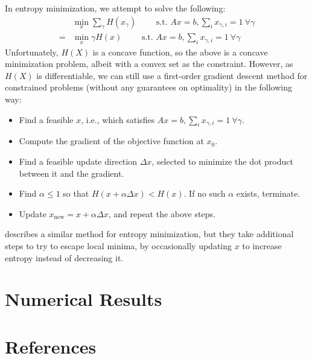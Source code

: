 \documentclass{article} %
\begin{document}
In entropy minimization, we attempt to solve the following:
\begin{align*}
&  \min_{x} \sum_\gamma H(x_\gamma) \qquad \text{ s.t. } Ax = b, \sum_i x_{\gamma, i} = 1\ \forall \gamma \\
=& \min_{x} \gamma H(x) \qquad \text{ s.t. } Ax = b, \sum_i x_{\gamma, i} = 1\ \forall \gamma
\end{align*}
Unfortunately, $H(X)$ is a concave function, so the above is a concave minimization problem, albeit with a convex set as the constraint.
However, as $H(X)$ is differentiable, we can still use a first-order gradient descent method for constrained problems (without any guarantees on optimality) in the following way:
\begin{itemize}
  \item Find a feasible $x$, i.e., which satisfies $Ax = b, \sum_i x_{\gamma, i} = 1\ \forall \gamma$.
  \item Compute the gradient of the objective function at $x_0$.
  \item Find a feasible update direction $\Delta x$, selected to minimize the dot product between it and the gradient.
  \item Find $\alpha \le 1$ so that $H(x + \alpha \Delta x) < H(x)$. If no such $\alpha$ exists, terminate.
  \item Update $x_\textrm{new} = x + \alpha \Delta x$, and repeat the above steps.
\end{itemize}
\cite{sudoku} describes a similar method for entropy minimization, but they take additional steps to try to escape local minima, by occasionally updating $x$ to increase entropy instead of decreasing it.

\section{Numerical Results}
\section{References}

\FloatBarrier
\vskip 0.2in
\nocite{*}


\end{document}
